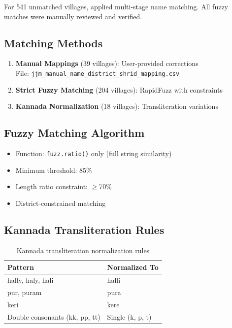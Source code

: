 \documentclass[11pt,a4paper]{article}
\begin{document}
For 541 unmatched villages, applied multi-stage name matching. All fuzzy matches were manually reviewed and verified.

\subsection{Matching Methods}

\begin{enumerate}
    \item \textbf{Manual Mappings} (39 villages): User-provided corrections\\
          File: \texttt{jjm\_manual\_name\_district\_shrid\_mapping.csv}
    \item \textbf{Strict Fuzzy Matching} (204 villages): RapidFuzz with constraints
    \item \textbf{Kannada Normalization} (18 villages): Transliteration variations
\end{enumerate}

\subsection{Fuzzy Matching Algorithm}

\begin{itemize}
    \item Function: \texttt{fuzz.ratio()} only (full string similarity)
    \item Minimum threshold: 85\%
    \item Length ratio constraint: $\geq$70\%
    \item District-constrained matching
\end{itemize}

\subsection{Kannada Transliteration Rules}

\begin{table}[h]
\centering
\begin{tabular}{ll}
\toprule
\textbf{Pattern} & \textbf{Normalized To} \\
\midrule
hally, haly, hali & halli \\
pur, puram & pura \\
keri & kere \\
Double consonants (kk, pp, tt) & Single (k, p, t) \\
\bottomrule
\end{tabular}
\caption{Kannada transliteration normalization rules}
\end{table}
\end{document}
